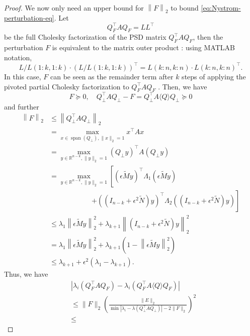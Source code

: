 \documentclass[10pt,a4paper]{amsart}
\newcommand{\image}{\operatorname{span}}
\def\realR{\mathbb{R}}
\begin{document}
\begin{proof}
We now only need an upper bound for $\left\|F\right\|_2$ to bound \eqref{eq:Nystrom-perturbation-eq}. Let 
\[
    Q_F^\top A Q_F = L L^\top
\]
be the full Cholesky factorization of the PSD matrix $Q_F^\top A Q_F$, then the perturbation $F$ is equivalent to the matrix outer product \cite{zhang2006schur}: using MATLAB notation, 
\[
    L / L(1:k, 1:k) \cdot (L / L(1:k, 1:k) )^\top = L(k:n, k:n) \cdot L(k:n, k:n)^\top.
\]
In this case, $F$ can be seen as the remainder term after $k$ steps of applying the pivoted partial Cholesky factorization to $Q_{F}^\top A Q_{F}$ \cite{chen2025randomly}. Then, we have
\[
    F \succeq 0, \quad Q_{\perp}^\top A Q_{\perp} - F = Q_{\perp}^\top A \langle Q \rangle Q_{\perp} \succeq 0
\]
and further
\[
    \begin{aligned}
        \left\|F\right\|_2
        & \leq
        \left\|Q_{\perp}^\top A Q_{\perp}\right\|_2 \\
        & =
        \max_{x \in \image(Q_{\perp}), \|x\|_2 = 1} x^\top A x \\
        & =
        \max_{y \in \realR^{n-k}, \|y\|_2 = 1} (Q_{\perp} y)^\top A (Q_{\perp} y) \\
        & = \max_{y \in \realR^{n-k}, \|y\|_2 = 1}
        \left[
        \left(\epsilon \widetilde{M} y\right)^\top \Lambda_1
        \left(\epsilon \widetilde{M} y\right) \right. \\
        & \qquad\qquad\qquad\left.
        + \left(\left(I_{n-k} + \epsilon^2 \widetilde{N}\right) y\right)^\top
        \Lambda_2
        \left(\left(I_{n-k} + \epsilon^2 \widetilde{N}\right) y\right)
        \right] \\
        & \leq \lambda_{1} \left\|\epsilon \widetilde{M} y\right\|_2^2 + \lambda_{k+1} \left\|\left(I_{n-k} + \epsilon^2 \widetilde{N}\right) y\right\|_2^2\\
        & = \lambda_{1} \left\|\epsilon \widetilde{M} y\right\|_2^2 + \lambda_{k+1}\left(1 - \left\|\epsilon \widetilde{M} y\right\|_2^2\right)\\
        & \leq \lambda_{k+1} + \epsilon^2 (\lambda_1 -\lambda_{k+1}). 
    \end{aligned}
\]
Thus, we have
\[
    \begin{aligned}
        & \left| \lambda_{i}(Q_{F}^\top A Q_{F}) - \lambda_{i}(Q_{F}^\top A \langle Q \rangle Q_{F}) \right| \\
        & \leq
        \|F\|_2 \left(\frac{\|E\|_2}{\min|\lambda_i - \lambda(Q_{\perp}^\top A Q_{\perp})| - 2 \|F\|_2}\right)^2 \\
        & \leq

\end{aligned}\]
\end{proof}
\end{document}
